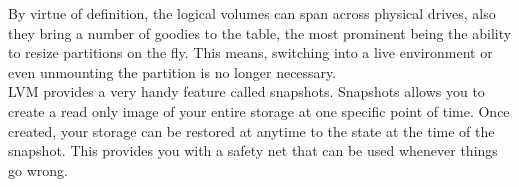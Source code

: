 By virtue of definition, the logical volumes can span across physical drives,
also they bring a number of goodies to the table, the most prominent being the
ability to resize partitions on the fly. This means, switching into a live
environment or even unmounting the partition is no longer necessary.\\

LVM provides a very handy feature called snapshots. Snapshots allows you to
create a read only image of your entire storage at one specific point of time.
Once created, your storage can be restored at anytime to the state at the time 
of the snapshot. This provides you with a safety net that can be used whenever
things go wrong.

